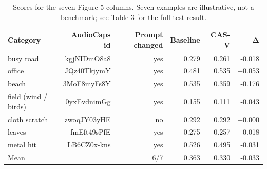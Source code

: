 \begin{table}[t]
\centering
\caption{Scores for the seven Figure 5 columns. Seven examples are illustrative, not a benchmark; see Table 3 for the full test result.}
\label{tab:table5_figure5_examples}
\begin{tabular}{lrrrrr}
\toprule
Category & AudioCaps id & Prompt changed & Baseline & CAS-V & Δ \\
\midrule
busy road & kgjNIDmO8a8 & yes & 0.279 & 0.261 & -0.018 \\
office & JQz40TkjymY & yes & 0.481 & 0.535 & +0.053 \\
beach & 3MoF8myFs8Y & yes & 0.535 & 0.359 & -0.176 \\
field (wind / birds) & 0yxEvdnimGg & yes & 0.155 & 0.111 & -0.043 \\
cloth scratch & zwoqJY03yHE & no & 0.292 & 0.292 & +0.000 \\
leaves & fmEft49sPfE & yes & 0.275 & 0.257 & -0.018 \\
metal hit & LB6CZ0x-kns & yes & 0.526 & 0.495 & -0.031 \\
Mean &  & 6/7 & 0.363 & 0.330 & -0.033 \\
\bottomrule
\end{tabular}
\end{table}
